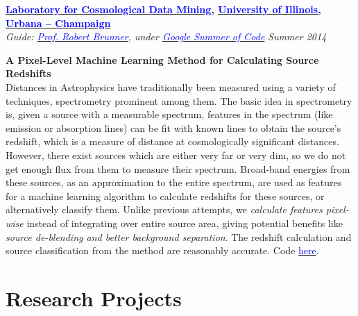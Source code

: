 \documentclass[margin,line]{res}
\newenvironment{list1}{
  \begin{list}{\ding{113}}{%
      \setlength{\itemsep}{0in}
      \setlength{\parsep}{0in} \setlength{\parskip}{0in}
      \setlength{\topsep}{0in} \setlength{\partopsep}{0in} 
      \setlength{\leftmargin}{0.17in}}}{\end{list}}
\begin{document}
\begin{resume}
{\bf \href{http://lcdm.astro.illinois.edu/}{\textcolor{blue} {Laboratory for Cosmological Data Mining}}, \href{http://www.illinois.edu/}{\textcolor{blue}{University of Illinois, Urbana -- Champaign}}} \\
{\em Guide: \href{http://www.astro.illinois.edu/people/bigdog}{\textcolor{blue}{Prof. Robert Brunner}}, under \href{https://www.google-melange.com/gsoc/homepage/google/gsoc2014}{\textcolor{blue} {Google Summer of Code}}} \hfill {\it Summer 2014} \\
\vspace*{-.13in}
\begin{list1}
\item[]\textbf{A Pixel-Level Machine Learning Method for Calculating Source Redshifts} \\
Distances in Astrophysics have traditionally been measured using a variety of techniques, spectrometry prominent among them. The basic idea in spectrometry is, given a source with a measurable spectrum, features in the spectrum (like emission or absorption lines) can be fit with known lines to obtain the source's redshift, which is a measure of distance at cosmologically significant distances. However, there exist sources which are either very far or very dim, so we do not get enough flux from them to measure their spectrum. Broad-band energies from these sources, as an approximation to the entire spectrum, are used as features for a machine learning algorithm to calculate redshifts for these sources, or alternatively classify them. Unlike previous attempts, we \textit{calculate features pixel-wise} instead of integrating over entire source area, giving potential benefits like \textit{source de-blending and better background separation}. The redshift calculation and source classification from the method are reasonably accurate. Code \href{https://github.com/alankarkotwal/image-photo-z/}{\textcolor{blue} {here}}.
\end{list1}

\newpage
\section{\sc Research Projects}


\end{resume}
\end{document}
